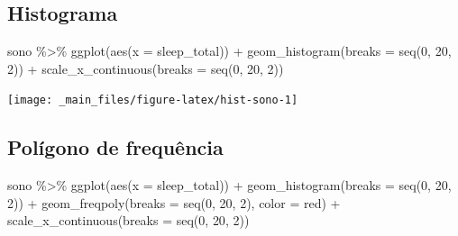 \documentclass[
  11pt]{report}
\newenvironment{Shaded}{\begin{snugshade}}{\end{snugshade}}
\newcommand{\AttributeTok}[1]{\textcolor[rgb]{0.77,0.63,0.00}{#1}}
\newcommand{\DecValTok}[1]{\textcolor[rgb]{0.00,0.00,0.81}{#1}}
\newcommand{\FunctionTok}[1]{\textcolor[rgb]{0.00,0.00,0.00}{#1}}
\newcommand{\NormalTok}[1]{#1}
\newcommand{\SpecialCharTok}[1]{\textcolor[rgb]{0.00,0.00,0.00}{#1}}
\newcommand{\StringTok}[1]{\textcolor[rgb]{0.31,0.60,0.02}{#1}}
\begin{document}
\hypertarget{histograma}{%
\subsection{Histograma}\label{histograma}}

\begin{Shaded}
\begin{Highlighting}[]
\NormalTok{sono }\SpecialCharTok{\%\textgreater{}\%} 
  \FunctionTok{ggplot}\NormalTok{(}\FunctionTok{aes}\NormalTok{(}\AttributeTok{x =}\NormalTok{ sleep\_total)) }\SpecialCharTok{+}
    \FunctionTok{geom\_histogram}\NormalTok{(}\AttributeTok{breaks =} \FunctionTok{seq}\NormalTok{(}\DecValTok{0}\NormalTok{, }\DecValTok{20}\NormalTok{, }\DecValTok{2}\NormalTok{)) }\SpecialCharTok{+}
    \FunctionTok{scale\_x\_continuous}\NormalTok{(}\AttributeTok{breaks =} \FunctionTok{seq}\NormalTok{(}\DecValTok{0}\NormalTok{, }\DecValTok{20}\NormalTok{, }\DecValTok{2}\NormalTok{))}
\end{Highlighting}
\end{Shaded}

\begin{center}\texttt{[image: \_main\_files/figure-latex/hist-sono-1]} \end{center}

\hypertarget{poluxedgono-de-frequuxeancia}{%
\subsection{Polígono de frequência}\label{poluxedgono-de-frequuxeancia}}

\begin{Shaded}
\begin{Highlighting}[]
\NormalTok{sono }\SpecialCharTok{\%\textgreater{}\%} 
  \FunctionTok{ggplot}\NormalTok{(}\FunctionTok{aes}\NormalTok{(}\AttributeTok{x =}\NormalTok{ sleep\_total)) }\SpecialCharTok{+}
    \FunctionTok{geom\_histogram}\NormalTok{(}\AttributeTok{breaks =} \FunctionTok{seq}\NormalTok{(}\DecValTok{0}\NormalTok{, }\DecValTok{20}\NormalTok{, }\DecValTok{2}\NormalTok{)) }\SpecialCharTok{+}
    \FunctionTok{geom\_freqpoly}\NormalTok{(}\AttributeTok{breaks =} \FunctionTok{seq}\NormalTok{(}\DecValTok{0}\NormalTok{, }\DecValTok{20}\NormalTok{, }\DecValTok{2}\NormalTok{), }\AttributeTok{color =} \StringTok{\textquotesingle{}red\textquotesingle{}}\NormalTok{) }\SpecialCharTok{+}
    \FunctionTok{scale\_x\_continuous}\NormalTok{(}\AttributeTok{breaks =} \FunctionTok{seq}\NormalTok{(}\DecValTok{0}\NormalTok{, }\DecValTok{20}\NormalTok{, }\DecValTok{2}\NormalTok{))}
\end{Highlighting}
\end{Shaded}
\end{document}
